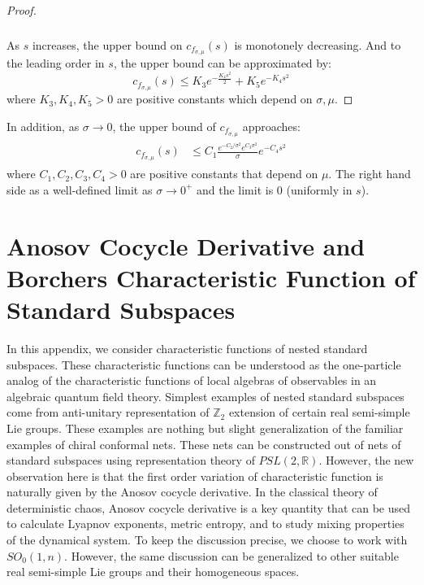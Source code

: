 \documentclass[a4paper,11pt]{article}
\theoremstyle{definition}
\begin{document}
\begin{proof}
\begin{align}
\begin{split}
        \end{split}
    \end{align}
    As $s$ increases, the upper bound on $c_{f_{\sigma,\mu}}(s)$ is monotonely decreasing. And to the leading order in $s$, the upper bound can be approximated by:
    \begin{equation}
        c_{f_{\sigma,\mu}}(s) \leq K_3e^{-\frac{K_4 s^2}{2}} + K_5e^{-K_4 s^2}
    \end{equation}
    where $K_3, K_4, K_5 > 0$ are positive constants which depend on $\sigma, \mu$. 
\end{proof}
In addition, as $\sigma \rightarrow 0$, the upper bound of $c_{f_{\sigma, \mu}}$ approaches:
\begin{align}
    \begin{split}
        c_{f_{\sigma,\mu}}(s) &\leq C_1 \frac{e^{-C_2/\sigma^2}e^{C_3\sigma^2}}{\sigma}e^{-C_4s^2}
    \end{split}
\end{align}
where $C_1,C_2,C_3, C_4 > 0$ are positive constants that depend on $\mu$. The right hand side as a well-defined limit as $\sigma\rightarrow 0^+$ and the limit is $0$ (uniformly in $s$).
\section{Anosov Cocycle Derivative and Borchers Characteristic Function of Standard Subspaces}\label{app:classicalborchers}


In this appendix, we consider characteristic functions of nested standard subspaces. These characteristic functions can be understood as the one-particle analog of the characteristic functions of local algebras of observables in an algebraic quantum field theory. Simplest examples of nested standard subspaces come from anti-unitary representation of $\mathbb{Z}_2$ extension of certain real semi-simple Lie groups. These examples are nothing but slight generalization of the familiar examples of chiral conformal nets. These nets can be constructed out of nets of standard subspaces using representation theory of $PSL(2,\mathbb{R})$. However, the new observation here is that the first order variation of characteristic function is naturally given by the Anosov cocycle derivative. In the classical theory of deterministic chaos, Anosov cocycle derivative is a key quantity that can be used to calculate Lyapnov exponents, metric entropy, and to study mixing properties of the dynamical system. To keep the discussion precise, we choose to work with $SO_0(1,n)$. However, the same discussion can be generalized to other suitable real semi-simple Lie groups and their homogeneous spaces.
\end{document}
